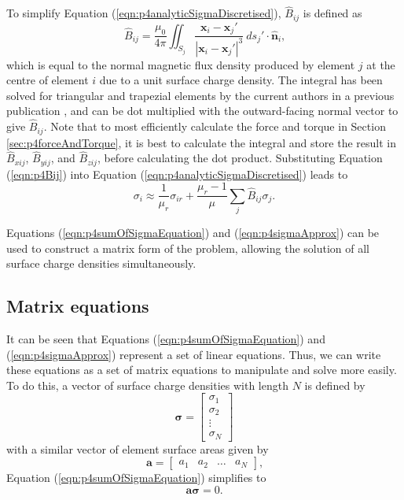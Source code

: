 To simplify Equation (\ref{eqn:p4analyticSigmaDiscretised}), \(\hat{B}_{ij}\) is defined as
\begin{equation}\label{eqn:p4Bij}
    \hat{B}_{ij} = \frac{\mu_0}{4\pi} \iint_{S_j} \frac{\mathbf{x}_i - \mathbf{x}_j'}{\left| \mathbf{x}_i - \mathbf{x}_j' \right|^3} \ ds_j' \cdot \hat{\mathbf{n}}_i \text{,}
\end{equation}
which is equal to the normal magnetic flux density produced by element \(j\) at the centre of element \(i\) due to a unit surface charge density. The integral has been solved for triangular and trapezial elements by the current authors in a previous publication \cite{OConnell2020a}, and can be dot multiplied with the outward-facing normal vector to give \(\hat{B}_{ij}\). Note that to most efficiently calculate the force and torque in Section \ref{sec:p4forceAndTorque}, it is best to calculate the integral and store the result in \(\hat{B}_{xij}\), \(\hat{B}_{yij}\), and \(\hat{B}_{zij}\), before calculating the dot product. Substituting Equation (\ref{eqn:p4Bij}) into Equation (\ref{eqn:p4analyticSigmaDiscretised}) leads to 
\begin{equation}\label{eqn:p4sigmaApprox}
    \sigma_i \approx \frac{1}{\mu_r} \sigma_{ir} + \frac{\mu_r - 1}{\mu} \sum_j \hat{B}_{ij} \sigma_j \text{.}
\end{equation}

Equations (\ref{eqn:p4sumOfSigmaEquation}) and (\ref{eqn:p4sigmaApprox}) can be used to construct a matrix form of the problem, allowing the solution of all surface charge densities simultaneously. 

\subsection{Matrix equations}
It can be seen that Equations (\ref{eqn:p4sumOfSigmaEquation}) and (\ref{eqn:p4sigmaApprox}) represent a set of linear equations. Thus, we can write these equations as a set of matrix equations to manipulate and solve more easily. To do this, a vector of surface charge densities with length \(N\) is defined by
\begin{equation}
    \bm{\sigma} = \begin{bmatrix} \sigma_1 \\ \sigma_2 \\ \vdots \\ \sigma_N \end{bmatrix}
\end{equation}
with a similar vector of element surface areas given by
\begin{equation}
    \mathbf{a} = \begin{bmatrix} a_1 & a_2 & \dots & a_N \end{bmatrix} \text{,}
\end{equation}
Equation (\ref{eqn:p4sumOfSigmaEquation}) simplifies to
\begin{equation}\label{eqn:p4gaussLawMatrixEquation}
    \mathbf{a} \bm{\sigma} = 0 \text{.}
\end{equation}

